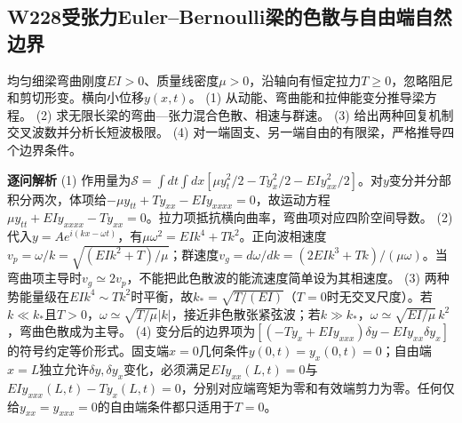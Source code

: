 \subsection*{W228\quad 受张力Euler–Bernoulli梁的色散与自由端自然边界}
均匀细梁弯曲刚度$EI>0$、质量线密度$\mu>0$，沿轴向有恒定拉力$T\ge0$，忽略阻尼和剪切形变。横向小位移$y(x,t)$。
(1) 从动能、弯曲能和拉伸能变分推导梁方程。
(2) 求无限长梁的弯曲—张力混合色散、相速与群速。
(3) 给出两种回复机制交叉波数并分析长短波极限。
(4) 对一端固支、另一端自由的有限梁，严格推导四个边界条件。
\par\textbf{逐问解析}
(1) 作用量为$\mathcal S=\int dt\int dx[\mu y_t^2/2-Ty_x^2/2-EIy_{xx}^2/2]$。对$y$变分并分部积分两次，体项给$-\mu y_{tt}+Ty_{xx}-EIy_{xxxx}=0$，故运动方程$\mu y_{tt}+EIy_{xxxx}-Ty_{xx}=0$。拉力项抵抗横向曲率，弯曲项对应四阶空间导数。
(2) 代入$y=Ae^{i(kx-\omega t)}$，有$\mu\omega^2=EIk^4+Tk^2$。正向波相速度$v_p=\omega/k=\sqrt{(EI k^2+T)/\mu}$；群速度$v_g=d\omega/dk=(2EIk^3+Tk)/(\mu\omega)$。当弯曲项主导时$v_g\simeq2v_p$，不能把此色散波的能流速度简单设为其相速度。
(3) 两种势能量级在$EIk^4\sim Tk^2$时平衡，故$k_*=\sqrt{T/(EI)}$（$T=0$时无交叉尺度）。若$k\ll k_*$且$T>0$，$\omega\simeq\sqrt{T/\mu}|k|$，接近非色散张紧弦波；若$k\gg k_*$，$\omega\simeq\sqrt{EI/\mu}\,k^2$，弯曲色散成为主导。
(4) 变分后的边界项为$[(-Ty_x+EI y_{xxx})\delta y-EIy_{xx}\delta y_x]$的符号约定等价形式。固支端$x=0$几何条件$y(0,t)=y_x(0,t)=0$；自由端$x=L$独立允许$\delta y,\delta y_x$变化，必须满足$EIy_{xx}(L,t)=0$与$EIy_{xxx}(L,t)-Ty_x(L,t)=0$，分别对应端弯矩为零和有效端剪力为零。任何仅给$y_{xx}=y_{xxx}=0$的自由端条件都只适用于$T=0$。
\par\medskip

